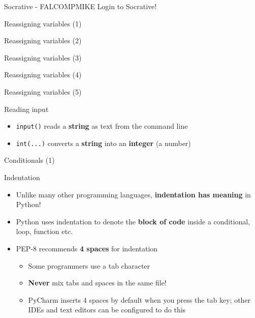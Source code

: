 \begin{frame}{Socrative - FALCOMPMIKE}
Login to Socrative!
\end{frame}

\begin{frame}{Reassigning variables (1)}
\end{frame}

\begin{frame}{Reassigning variables (2)}
\end{frame}

\begin{frame}{Reassigning variables (3)}
\end{frame}

\begin{frame}{Reassigning variables (4)}
\end{frame}

\begin{frame}{Reassigning variables (5)}
\end{frame}

\begin{frame}{Reading input}

\begin{itemize}
\item \lstinline{input()} reads a \textbf{string} as text from the command line
\item \lstinline{int(...)} converts a \textbf{string} into an \textbf{integer} (a number)
\end{itemize}
\end{frame}

\begin{frame}{Conditionals (1)}
\end{frame}

\begin{frame}{Indentation}
\begin{itemize}
\item Unlike many other programming languages, \textbf{indentation has meaning} in Python!
\item Python uses indentation to denote the \textbf{block of code} inside a conditional, loop, function etc.
\item PEP-8 recommends \textbf{4 spaces} for indentation
\begin{itemize}
\item Some programmers use a tab character
\item \textbf{Never} mix tabs and spaces in the same file!
\item PyCharm inserts 4 spaces by default when you press the tab key;
other IDEs and text editors can be configured to do this
\end{itemize}
\end{itemize}
\end{frame}

